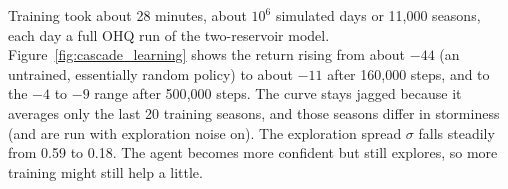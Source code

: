 Training took about 28 minutes, about $10^6$ simulated days or 11{,}000
seasons, each day a full OHQ run of the two-reservoir model.
Figure~\ref{fig:cascade_learning} shows the return rising from about $-44$
(an untrained, essentially random policy) to about $-11$ after 160{,}000
steps, and to the $-4$ to $-9$ range after 500{,}000 steps. The curve stays
jagged because it averages only the last 20 training seasons, and those
seasons differ in storminess (and are run with exploration noise on). The
exploration spread $\sigma$ falls steadily from 0.59 to 0.18. The agent
becomes more confident but still explores, so more training might still
help a little.
